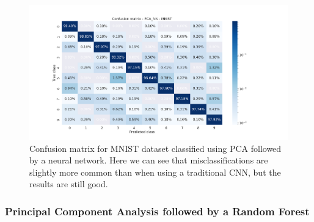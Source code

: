 \documentclass[onecolumn,10pt,cleanfoot]{asme2ej}
\begin{document}

\begin{figure}[H]
\centerline{\includegraphics[width=8in]{figure/conf_pca_nn_MNIST.png}}
\caption{Confusion matrix for MNIST dataset classified using PCA followed by a neural network. Here we can see that misclassifications are slightly more common than when using a traditional CNN, but the results are still good.}
\label{mnistheatmap_pcann}
\end{figure}


\subsubsection{Principal Component Analysis followed by a Random Forest}
\end{document}

